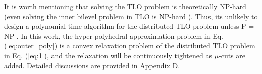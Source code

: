 \documentclass[letterpaper]{article} %
\begin{document}
It is worth mentioning that solving the TLO problem is theoretically NP-hard (even solving the inner bilevel problem in TLO is NP-hard \cite{ben1990computational}). Thus, its unlikely to design a polynomial-time algorithm for the distributed TLO problem unless P = NP \cite{arora2009computational}.  In this work, the hyper-polyhedral
approximation problem in Eq. (\ref{eq:outer_poly}) is a convex relaxation problem of the distributed TLO problem in Eq. (\ref{eq:1}), and the relaxation will be continuously tightened as $\mu$-cuts are added. Detailed discussions are provided in Appendix D.

\end{document}
